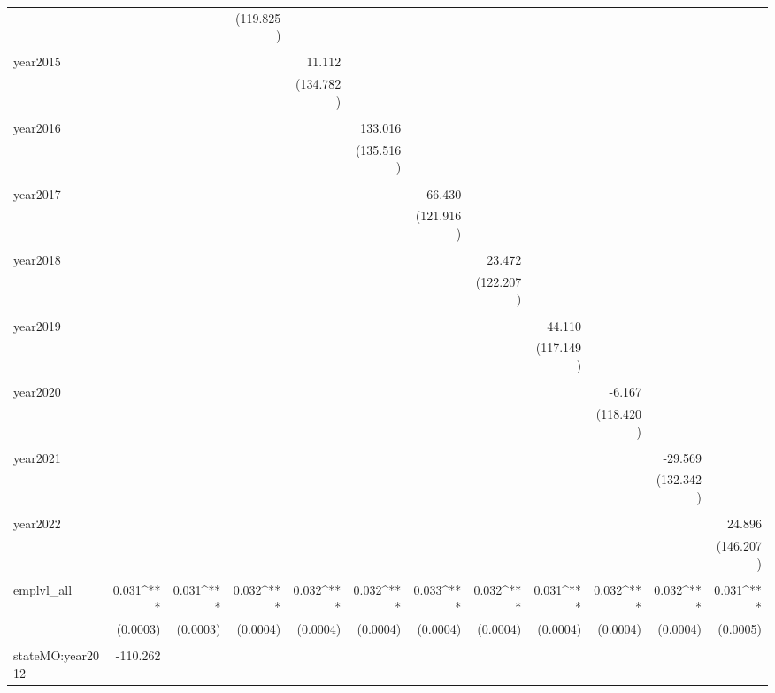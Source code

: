 \documentclass[
]{article}
\begin{document}
\begin{table}[!htbp]
\begin{tabular}{@{\extracolsep{5pt}}lD{.}{.}{-3} D{.}{.}{-3} D{.}{.}{-3} D{.}{.}{-3} D{.}{.}{-3} D{.}{.}{-3} D{.}{.}{-3} D{.}{.}{-3} D{.}{.}{-3} D{.}{.}{-3} D{.}{.}{-3} }
  &  &  & (119.825) &  &  &  &  &  &  &  &  \\ 
  & & & & & & & & & & & \\ 
 year2015 &  &  &  & 11.112 &  &  &  &  &  &  &  \\ 
  &  &  &  & (134.782) &  &  &  &  &  &  &  \\ 
  & & & & & & & & & & & \\ 
 year2016 &  &  &  &  & 133.016 &  &  &  &  &  &  \\ 
  &  &  &  &  & (135.516) &  &  &  &  &  &  \\ 
  & & & & & & & & & & & \\ 
 year2017 &  &  &  &  &  & 66.430 &  &  &  &  &  \\ 
  &  &  &  &  &  & (121.916) &  &  &  &  &  \\ 
  & & & & & & & & & & & \\ 
 year2018 &  &  &  &  &  &  & 23.472 &  &  &  &  \\ 
  &  &  &  &  &  &  & (122.207) &  &  &  &  \\ 
  & & & & & & & & & & & \\ 
 year2019 &  &  &  &  &  &  &  & 44.110 &  &  &  \\ 
  &  &  &  &  &  &  &  & (117.149) &  &  &  \\ 
  & & & & & & & & & & & \\ 
 year2020 &  &  &  &  &  &  &  &  & -6.167 &  &  \\ 
  &  &  &  &  &  &  &  &  & (118.420) &  &  \\ 
  & & & & & & & & & & & \\ 
 year2021 &  &  &  &  &  &  &  &  &  & -29.569 &  \\ 
  &  &  &  &  &  &  &  &  &  & (132.342) &  \\ 
  & & & & & & & & & & & \\ 
 year2022 &  &  &  &  &  &  &  &  &  &  & 24.896 \\ 
  &  &  &  &  &  &  &  &  &  &  & (146.207) \\ 
  & & & & & & & & & & & \\ 
 emplvl\_all & 0.031^{***} & 0.031^{***} & 0.032^{***} & 0.032^{***} & 0.032^{***} & 0.033^{***} & 0.032^{***} & 0.031^{***} & 0.032^{***} & 0.032^{***} & 0.031^{***} \\ 
  & (0.0003) & (0.0003) & (0.0004) & (0.0004) & (0.0004) & (0.0004) & (0.0004) & (0.0004) & (0.0004) & (0.0004) & (0.0005) \\ 
  & & & & & & & & & & & \\ 
 stateMO:year2012 & -110.262 &  &  &  &  &  &  &  &  &  &  \\ 

\end{tabular}
\end{table}
\end{document}
